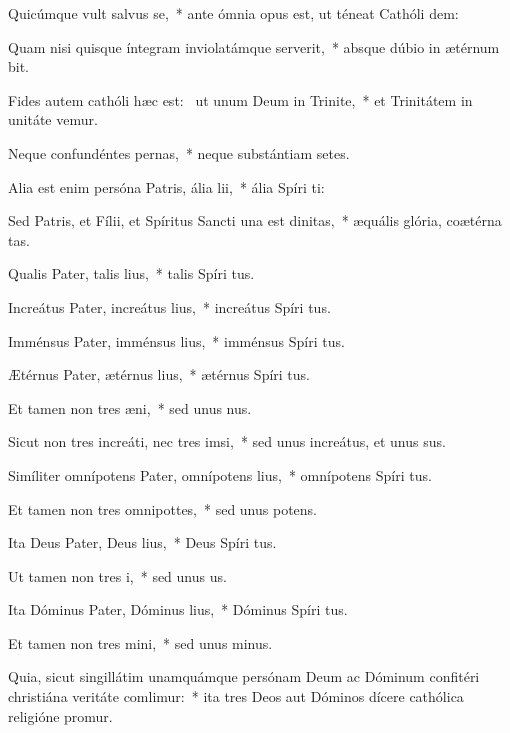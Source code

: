 \item Quicúmque vult salvus se,~* ante ómnia opus est, ut téneat Cathóli dem:
\item Quam nisi quisque íntegram inviolatámque serverit,~* absque dúbio in ætérnum bit.
\item Fides autem cathóli hæc est:~\pscross{} ut unum Deum in Trinite,~* et Trinitátem in unitáte vemur.
\item Neque confundéntes pernas,~* neque substántiam setes.
\item Alia est enim persóna Patris, ália lii,~* ália Spíri ti:
\item Sed Patris, et Fílii, et Spíritus Sancti una est dinitas,~* æquális glória, coætérna tas.
\item Qualis Pater, talis lius,~* talis Spíri tus.
\item Increátus Pater, increátus lius,~* increátus Spíri tus.
\item Imménsus Pater, imménsus lius,~* imménsus Spíri tus.
\item Ætérnus Pater, ætérnus lius,~* ætérnus Spíri tus.
\item Et tamen non tres æni,~* sed unus nus.
\item Sicut non tres increáti, nec tres imsi,~* sed unus increátus, et unus sus.
\item Simíliter omnípotens Pater, omnípotens lius,~* omnípotens Spíri tus.
\item Et tamen non tres omnipottes,~* sed unus potens.
\item Ita Deus Pater, Deus lius,~* Deus Spíri tus.
\item Ut tamen non tres i,~* sed unus  us.
\item Ita Dóminus Pater, Dóminus lius,~* Dóminus Spíri tus.
\item Et tamen non tres mini,~* sed unus  minus.
\item Quia, sicut singillátim unamquámque persónam Deum ac Dóminum confitéri christiána veritáte comlimur:~* ita tres Deos aut Dóminos dícere cathólica religióne promur.
